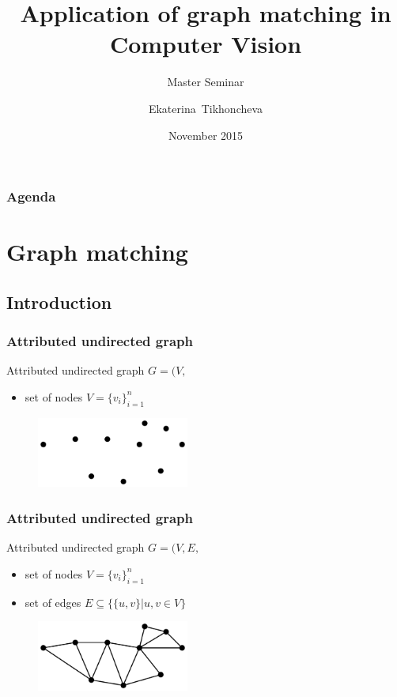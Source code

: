 \documentclass[hyperref={pdfpagelabels=false}]{beamer}
\title[Application of graph matching in Computer Vision]
	{Application of graph matching in Computer Vision}
\subtitle{Master Seminar}
\author[E.~Tikhoncheva] %
	{Ekaterina~Tikhoncheva}
\institute[Universities Here and There] %
	{University of Heidelberg\\
	Faculty of Mathematics and Computer Science \\
	Computer Vision group \\
	at\\
	Heidelberg Collaboratory for Image Processing
}
\date[2015]{November 2015}
\begin{document}
\begin{frame}
\titlepage
\end{frame}
\begin{frame}
\frametitle{Agenda}
\tableofcontents
\end{frame} 
\section{Graph matching} 
\subsection{Introduction}
\begin{frame}[allowframebreaks]
\frametitle{Attributed undirected graph}

Attributed undirected graph $G=(V,$
\begin{itemize}
\item set of nodes $V=\{v_i\}_{i=1}^{n}$
\end{itemize}
\vspace{2cm}
\begin{figure}[b]
    \centering
    \includegraphics[width=5cm]{fig/graph_1_nodes.pdf}
\end{figure}%
\framebreak
\frametitle{Attributed undirected graph}
Attributed undirected graph $G=(V,E,$
\begin{itemize}
\item set of nodes $V=\{v_i\}_{i=1}^{n}$
\item set of edges $E\subseteq\{\{u,v\}| u, v\in V\}$
\end{itemize}
\vspace{1.5cm}
\begin{figure}[b]
    \centering
    \includegraphics[width=5cm]{fig/graph_1.pdf}
\end{figure}%
\end{frame}
\end{document}
